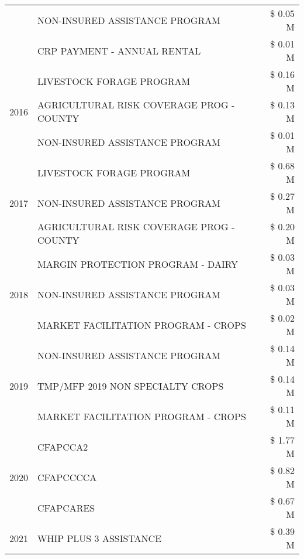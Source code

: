 \begin{tabular}{llr}
 & NON-INSURED ASSISTANCE PROGRAM & \$ 0.05 M \\
 & CRP PAYMENT - ANNUAL RENTAL & \$ 0.01 M \\
\cline{1-3}
\multirow[t]{3}{*}{2016} & LIVESTOCK FORAGE PROGRAM & \$ 0.16 M \\
 & AGRICULTURAL RISK COVERAGE PROG - COUNTY & \$ 0.13 M \\
 & NON-INSURED ASSISTANCE PROGRAM & \$ 0.01 M \\
\cline{1-3}
\multirow[t]{3}{*}{2017} & LIVESTOCK FORAGE PROGRAM & \$ 0.68 M \\
 & NON-INSURED ASSISTANCE PROGRAM & \$ 0.27 M \\
 & AGRICULTURAL RISK COVERAGE PROG - COUNTY & \$ 0.20 M \\
\cline{1-3}
\multirow[t]{3}{*}{2018} & MARGIN PROTECTION PROGRAM - DAIRY & \$ 0.03 M \\
 & NON-INSURED ASSISTANCE PROGRAM & \$ 0.03 M \\
 & MARKET FACILITATION PROGRAM - CROPS & \$ 0.02 M \\
\cline{1-3}
\multirow[t]{3}{*}{2019} & NON-INSURED ASSISTANCE PROGRAM & \$ 0.14 M \\
 & TMP/MFP 2019 NON SPECIALTY CROPS & \$ 0.14 M \\
 & MARKET FACILITATION PROGRAM - CROPS & \$ 0.11 M \\
\cline{1-3}
\multirow[t]{3}{*}{2020} & CFAPCCA2 & \$ 1.77 M \\
 & CFAPCCCCA & \$ 0.82 M \\
 & CFAPCARES & \$ 0.67 M \\
\cline{1-3}
2021 & WHIP PLUS 3 ASSISTANCE & \$ 0.39 M \\
\cline{1-3}
\bottomrule
\end{tabular}

